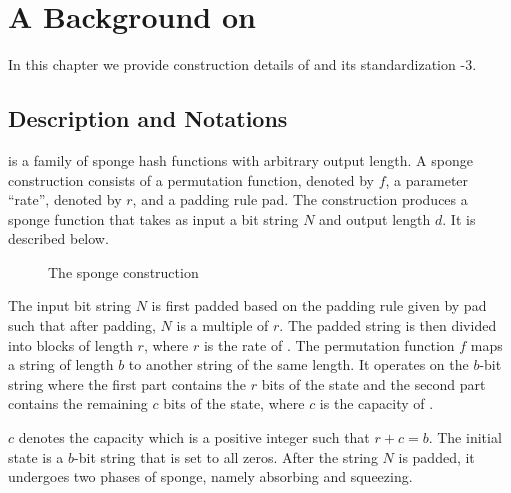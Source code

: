 \chapter{A Background on \KECCAK{}}
\label{chap:design-impl}

In this chapter we provide construction details of \KECCAK{} and its standardization \SHA-$3$.

\section{\Keccak{} Description and Notations}
\Keccak{} is a family of sponge hash functions with arbitrary output length. A sponge construction consists of a permutation function, denoted by $f$, a parameter ``rate'', denoted by $r$, and a padding rule pad. The construction produces a sponge function that takes as input a bit string $N$ and output length $d$. 
It is described below.

\begin{figure}[H]
\caption{The sponge construction~\cite{bertoni2011cryptographic}\label{sponge}}
\end{figure}

The input bit string $N$ is first padded based on the padding rule given by pad such that after padding, $N$ is a multiple of $r$. The padded string is then divided into blocks of length $r$, where $r$ is the rate of \KECCAK{}. The permutation function $f$ maps a string of length $b$ to another string of the same length. It operates on the $b$-bit string where the first part contains the $r$ bits of the state and the second part contains the remaining $c$ bits of the state, where $c$ is the capacity of \KECCAK{}. 

$c$ denotes the capacity which is a positive integer such that $r + c = b$. The initial state is a $b$-bit string that is set to all zeros. After the string $N$ is padded, it undergoes two phases of sponge, namely absorbing and squeezing. 

